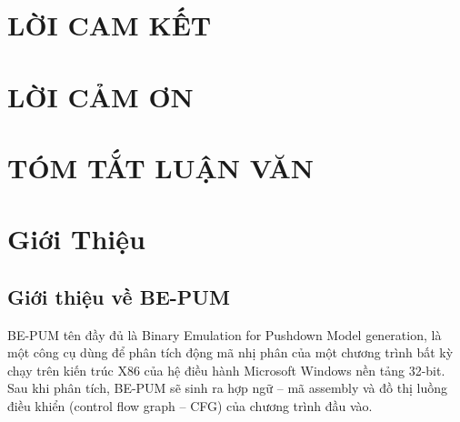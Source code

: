 \documentclass[14pt]{hcmutarticle}
\newcommand\blankpage{%
    \null
    \thispagestyle{empty}%
    \addtocounter{page}{-1}%
    \newpage}
\begin{document}

\fancyhead[L]{}
\fancyhead[R]{}




\afterpage{\blankpage}

\setcounter{secnumdepth}{-2}

\newpage
\chapter{LỜI CAM KẾT}


\newpage
\chapter{LỜI CẢM ƠN}


\newpage
\chapter{TÓM TẮT LUẬN VĂN}



\newpage
\tableofcontents
\setcounter{secnumdepth}{5}

\newpage
\listoffigures %

\newpage
\listoftables %

\newpage
\printglossary[title=Danh mục các từ viết tắt,toctitle=Danh mục các từ viết tắt]

\newpage


\fancyhead[L]{}
\fancyhead[R]{\leftmark}


\newpage
\chapter{Giới Thiệu}

\section{Giới thiệu về BE-PUM}

BE-PUM tên đầy đủ là Binary Emulation for Pushdown Model generation, là một công cụ dùng để phân tích động mã nhị phân của một chương trình bất kỳ chạy trên kiến trúc X86 của hệ điều hành Microsoft Windows nền tảng 32-bit. Sau khi phân tích, BE-PUM sẽ sinh ra hợp ngữ – mã assembly và đồ thị luồng điều khiển (control flow graph – CFG) của chương trình đầu vào.\\
\end{document}
